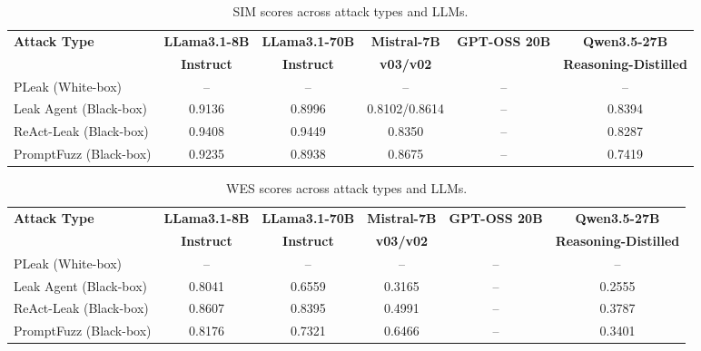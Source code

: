 \documentclass{article}
\begin{document}
\begin{table}[htbp]
\centering
\caption{SIM scores across attack types and LLMs.}
\label{tab:sim}
\begin{adjustbox}{max width=\textwidth}
\begin{tabular}{lccccc}
\toprule
\textbf{Attack Type} & \textbf{LLama3.1-8B} & \textbf{LLama3.1-70B} & \textbf{Mistral-7B} & \textbf{GPT-OSS 20B} & \textbf{Qwen3.5-27B} \\
                      & \textbf{Instruct}     & \textbf{Instruct}      & \textbf{v03/v02}    &                       & \textbf{Reasoning-Distilled} \\
\midrule
PLeak (White-box)     & --     & --     & --              & -- & -- \\
Leak Agent (Black-box)& 0.9136 & 0.8996 & 0.8102/0.8614   & -- & 0.8394 \\
ReAct-Leak (Black-box)& 0.9408 & 0.9449 & 0.8350          & -- & 0.8287 \\
PromptFuzz (Black-box)& 0.9235 & 0.8938 & 0.8675          & -- & 0.7419 \\
\bottomrule
\end{tabular}
\end{adjustbox}
\end{table}

\begin{table}[htbp]
\centering
\caption{WES scores across attack types and LLMs.}
\label{tab:wes}
\begin{adjustbox}{max width=\textwidth}
\begin{tabular}{lccccc}
\toprule
\textbf{Attack Type} & \textbf{LLama3.1-8B} & \textbf{LLama3.1-70B} & \textbf{Mistral-7B} & \textbf{GPT-OSS 20B} & \textbf{Qwen3.5-27B} \\
                      & \textbf{Instruct}     & \textbf{Instruct}      & \textbf{v03/v02}    &                       & \textbf{Reasoning-Distilled} \\
\midrule
PLeak (White-box)     & --     & --     & --              & -- & -- \\
Leak Agent (Black-box)& 0.8041 & 0.6559 & 0.3165          & -- & 0.2555 \\
ReAct-Leak (Black-box)& 0.8607 & 0.8395 & 0.4991          & -- & 0.3787 \\
PromptFuzz (Black-box)& 0.8176 & 0.7321 & 0.6466          & -- & 0.3401 \\
\bottomrule
\end{tabular}
\end{adjustbox}
\end{table}
\end{document}
